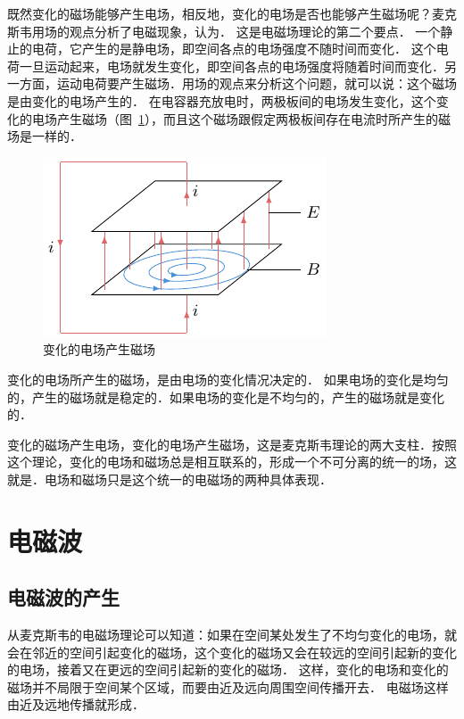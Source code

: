 既然变化的磁场能够产生电场，相反地，变化的电场是否也能够产生磁场呢？麦克斯韦用场的观点分析了电磁现象，认为．
这是电磁场理论的第二个要点．
一个静止的电荷，它产生的是静电场，即空间各点的电场强度不随时间而变化．
这个电荷一旦运动起来，电场就发生变化，即空间各点的电场强度将随着时间而变化．另一方面，运动电荷要产生磁场．用场的观点来分析这个问题，就可以说：这个磁场是由变化的电场产生的．
在电容器充放电时，两极板间的电场发生变化，这个变化的电场产生磁场（图~\ref{fig_C_4-5}），而且这个磁场跟假定两极板间存在电流时所产生的磁场是一样的．
\begin{figure}[htbp]
    \centering
    \includegraphics{fig/C/4-5.pdf}
    \caption{变化的电场产生磁场}\label{fig_C_4-5}
\end{figure}


变化的电场所产生的磁场，是由电场的变化情况决定的．
如果电场的变化是均匀的，产生的磁场就是稳定的．如果电场的变化是不均匀的，产生的磁场就是变化的．

变化的磁场产生电场，变化的电场产生磁场，这是麦克斯韦理论的两大支柱．按照这个理论，变化的电场和磁场总是相互联系的，形成一个不可分离的统一的场，这就是．电场和磁场只是这个统一的电磁场的两种具体表现．

\section{电磁波}
\subsection{电磁波的产生}

从麦克斯韦的电磁场理论可以知道：如果在空间某处发生了不均匀变化的电场，就会在邻近的空间引起变化的磁场，这个变化的磁场又会在较远的空间引起新的变化的电场，接着又在更远的空间引起新的变化的磁场．
这样，变化的电场和变化的磁场并不局限于空间某个区域，而要由近及远向周围空间传播开去．
电磁场这样由近及远地传播就形成．


